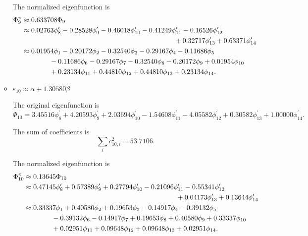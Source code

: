\documentclass[a4paper]{book}
\begin{document}
\begin{solution}
\begin{enumerate}[label=(\alph*)]
\begin{itemize}
		The normalized eigenfunction is		
		\begin{align}
			\Phi^\pi_9 &\approx 0.633708 \Phi_9 \notag \\
			&\approx 0.02763 \phi^\prime_8 - 0.28528 \phi^\prime_9 -0.46018 \phi^\prime_{10} -0.41249 \phi^\prime_{11} -0.16526 \phi^\prime_{12}  \notag\\
			&\hspace*{22em} + 0.32717 \phi^\prime_{13} + 0.63371 \phi^\prime_{14} \notag \\
			&\approx 0.01954 \phi_1 -0.20172 \phi_2 - 0.32540 \phi_3 -0.29167 \phi_4 -0.11686 \phi_5  \notag \\
			&\hspace*{4em} -0.11686 \phi_6 -0.29167 \phi_7 -0.32540\phi_8 -0.20172 \phi_9  +0.01954 \phi_{10} \notag \\
			&\hspace*{4em} +0.23134 \phi_{11} + 0.44810 \phi_{12} + 0.44810 \phi_{13} + 0.23134 \phi_{14} .
		\end{align}
		
		
		\item $\varepsilon_{10} \approx \alpha + 1.30580 \beta$
		
		The original eigenfunction is
		\begin{equation*}
			\Phi_{10} =  3.45516 \phi^\prime_8 + 4.20593 \phi^\prime_9 + 2.03694  \phi^\prime_{10} -1.54608 \phi^\prime_{11}   -4.05582 \phi^\prime_{12} + 0.30582 \phi^\prime_{13} +1.00000 \phi^\prime_{14}.
		\end{equation*}
		
		The sum of coefficients is
		\begin{equation*}
			\sum_{i} c^2_{10,i} =  53.7106.
		\end{equation*}
		
		The normalized eigenfunction is		
		\begin{align}
			\Phi^\pi_{10} &\approx 0.13645 \Phi_{10} \notag \\
			&\approx 0.47145 \phi^\prime_8 + 0.57389 \phi^\prime_9 + 0.27794 \phi^\prime_{10} -0.21096 \phi^\prime_{11} -0.55341 \phi^\prime_{12}  \notag\\
			&\hspace*{22em} + 0.04173 \phi^\prime_{13} + 0.13644 \phi^\prime_{14} \notag \\
			&\approx 0.33337 \phi_1 + 0.40580 \phi_2 + 0.19653  \phi_3 -0.14917 \phi_4  -0.39132 \phi_5  \notag \\
			&\hspace*{4em}  -0.39132 \phi_6  -0.14917 \phi_7 + 0.19653  \phi_8  + 0.40580 \phi_9  + 0.33337 \phi_{10} \notag \\
			&\hspace*{4em} +0.02951 \phi_{11} +0.09648  \phi_{12}  +0.09648 \phi_{13} + 0.02951 \phi_{14} .
		\end{align}
		

\end{itemize}
\end{enumerate}
\end{solution}
\end{document}
